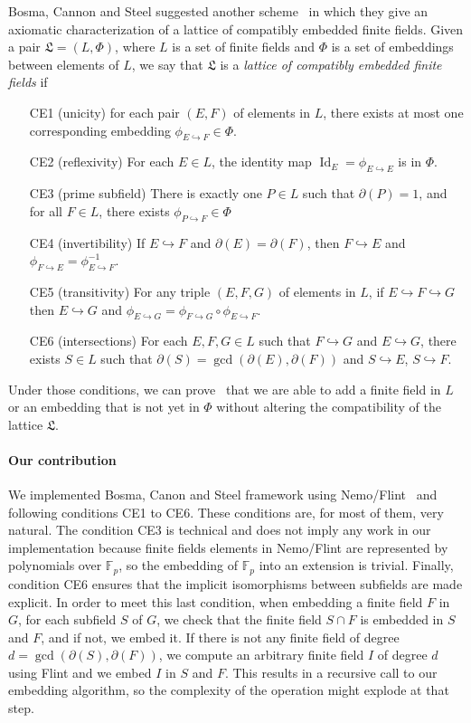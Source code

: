 \documentclass[12pt]{article}
\DeclareMathOperator{\Id}{Id}
\newcommand{\dE}{\partial(E)}
\newcommand{\dF}{\partial(F)}
\newcommand{\emb}{\hookrightarrow}
\newcommand{\embed}[2]{\phi_{#1\hookrightarrow#2}}
\begin{document}
Bosma, Cannon and Steel suggested another scheme~\cite{BCS97} in which they
give an axiomatic characterization of a lattice of compatibly embedded finite
fields. Given a pair $\mathfrak L=(L, \Phi)$, where
$L$ is a set of finite fields and $\Phi$ is a set of embeddings between
elements of $L$, we say that $\mathfrak L$ is a \emph{lattice of compatibly
embedded finite fields} if
\begin{enumerate}
  \item[CE1] (unicity) for each pair $(E, F)$ of elements in $L$, there exists
    at most one corresponding embedding $\embed{E}{F}\in\Phi$.
  \item[CE2] (reflexivity) For each $E\in L$, the identity map
    $\Id_E=\embed{E}{E}$ is in $\Phi$.
  \item[CE3] (prime subfield) There is exactly one $P\in L$ such that $\partial
    (P) = 1$, and for all $F\in L$, there exists $\embed{P}{F}\in\Phi$
  \item[CE4] (invertibility) If $E\emb F$ and $\dE=\dF$, then $F\emb E$ and
    $\embed{F}{E}=\embed{E}{F}^{-1}$.
  \item[CE5] (transitivity) For any triple $(E, F, G)$ of elements in $L$, if $E\emb
    F\emb G$ then $E\emb G$ and
    $\embed{E}{G}=\embed{F}{G}\circ\embed{E}{F}$.
  \item[CE6](intersections) For each $E, F, G\in L$ such that $F\emb G$ and
    $E\emb G$, there exists $S\in L$ such that $\partial(S)=\gcd(\dE, \dF)$
    and $S\emb E$, $S\emb F$.
\end{enumerate}

Under those conditions, we can prove~\cite{BCS97} that we are able to add a
finite field in
$L$ or an embedding that is not yet in $\Phi$ without altering the compatibility
of the lattice $\mathfrak L$.

\paragraph{Our contribution}

We implemented Bosma, Canon and Steel framework using Nemo/Flint~\cite{Nemo,
Flint} and following conditions CE1 to CE6. These
conditions are, for most of them, very natural. The condition CE3 is
technical and does not imply any work in our implementation because
finite fields elements in Nemo/Flint are represented by
polynomials over $\mathbb{F}_p$, so the embedding of $\mathbb{F}_p$ into an
extension is trivial. Finally, condition
CE6 ensures that the implicit isomorphisms between subfields are made
explicit. In order to meet this last condition, when embedding a finite field
$F$ in $G$, for each subfield $S$ of $G$, we check that the finite field $S\cap F$ is 
embedded in $S$ and $F$, and if not, we embed it. If there is not
any finite field of degree $d=\gcd(\partial(S), \dF)$, we compute an
arbitrary finite field $I$ of degree $d$ using Flint
and we embed $I$ in $S$ and $F$. This results in a recursive call to our
embedding algorithm, so the complexity of the operation might explode at that step.
\end{document}
